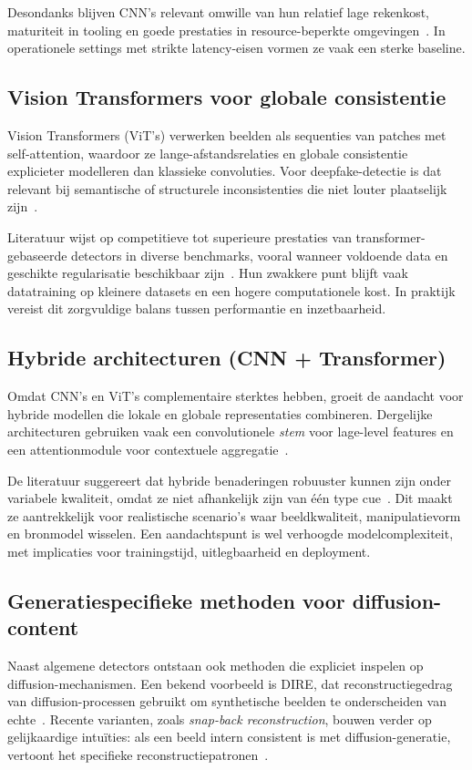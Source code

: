 Desondanks blijven CNN's relevant omwille van hun relatief lage rekenkost, maturiteit in tooling en goede prestaties in resource-beperkte omgevingen~\autocite{Raza2026,CompressionHybrid2025}. In operationele settings met strikte latency-eisen vormen ze vaak een sterke baseline.

\subsection{Vision Transformers voor globale consistentie}
Vision Transformers (ViT's) verwerken beelden als sequenties van patches met self-attention, waardoor ze lange-afstandsrelaties en globale consistentie explicieter modelleren dan klassieke convoluties. Voor deepfake-detectie is dat relevant bij semantische of structurele inconsistenties die niet louter plaatselijk zijn~\autocite{QuantumViT2025,CNNViTCompare2026}.

Literatuur wijst op competitieve tot superieure prestaties van transformer-gebaseerde detectors in diverse benchmarks, vooral wanneer voldoende data en geschikte regularisatie beschikbaar zijn~\autocite{Raza2026}. Hun zwakkere punt blijft vaak datatraining op kleinere datasets en een hogere computationele kost. In praktijk vereist dit zorgvuldige balans tussen performantie en inzetbaarheid.

\subsection{Hybride architecturen (CNN + Transformer)}
Omdat CNN's en ViT's complementaire sterktes hebben, groeit de aandacht voor hybride modellen die lokale en globale representaties combineren. Dergelijke architecturen gebruiken vaak een convolutionele \emph{stem} voor lage-level features en een attentionmodule voor contextuele aggregatie~\autocite{CNNViTCompare2026,CompressionHybrid2025}. 

De literatuur suggereert dat hybride benaderingen robuuster kunnen zijn onder variabele kwaliteit, omdat ze niet afhankelijk zijn van één type cue~\autocite{CompressionHybrid2025}. Dit maakt ze aantrekkelijk voor realistische scenario's waar beeldkwaliteit, manipulatievorm en bronmodel wisselen. Een aandachtspunt is wel verhoogde modelcomplexiteit, met implicaties voor trainingstijd, uitlegbaarheid en deployment.

\subsection{Generatiespecifieke methoden voor diffusion-content}
Naast algemene detectors ontstaan ook methoden die expliciet inspelen op diffusion-mechanismen. Een bekend voorbeeld is DIRE, dat reconstructiegedrag van diffusion-processen gebruikt om synthetische beelden te onderscheiden van echte~\autocite{WangDIRE2023}. Recente varianten, zoals \emph{snap-back reconstruction}, bouwen verder op gelijkaardige intuïties: als een beeld intern consistent is met diffusion-generatie, vertoont het specifieke reconstructiepatronen~\autocite{SnapBack2025}.

